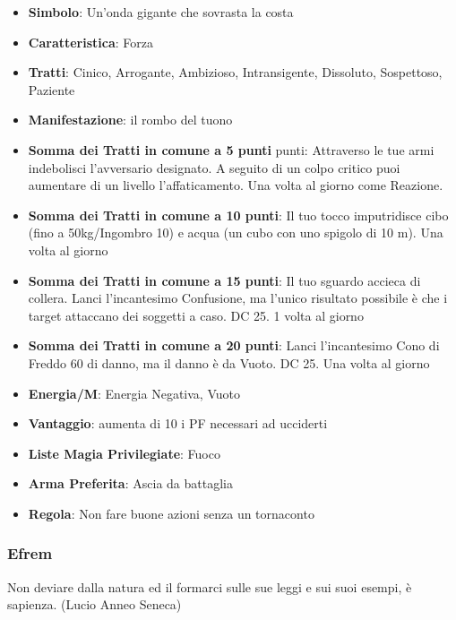 \begin{multicols}{2}
\begin{itemize}[leftmargin=*] \setlength{\itemsep}{0pt}
\item \textbf{Simbolo}: Un'onda gigante che sovrasta la costa
\item \textbf{Caratteristica}: Forza
\item \textbf{Tratti}: Cinico, Arrogante, Ambizioso, Intransigente, Dissoluto, Sospettoso, Paziente
\item \textbf{Manifestazione}: il rombo del tuono
\item \textbf{Somma dei Tratti in comune a 5 punti} punti: Attraverso le tue armi indebolisci l'avversario designato. A seguito di un colpo critico puoi aumentare di un livello l'affaticamento. Una volta al giorno come Reazione.
\item \textbf{Somma dei Tratti in comune a 10 punti}: Il tuo tocco imputridisce cibo (fino a 50kg/Ingombro 10) e acqua (un cubo con uno spigolo di 10 m). Una volta al giorno
\item \textbf{Somma dei Tratti in comune a 15 punti}: Il tuo sguardo accieca di collera. Lanci l'incantesimo Confusione, ma l'unico risultato possibile è che i target attaccano dei soggetti a caso. DC 25. 1 volta al giorno
\item \textbf{Somma dei Tratti in comune a 20 punti}: Lanci l'incantesimo Cono di Freddo 60 di danno, ma il danno è da Vuoto. DC 25. Una volta al giorno
\item \textbf{Energia/M}: Energia Negativa, Vuoto
\item \textbf{Vantaggio}: aumenta di 10 i PF necessari ad ucciderti
\item \textbf{Liste Magia Privilegiate}: Fuoco
\item \textbf{Arma Preferita}: Ascia da battaglia
\item \textbf{Regola}: Non fare buone azioni senza un tornaconto
\end{itemize}

\subsubsection{Efrem}\label{efrem}\hypertarget{efrem}{}

\begin{changemargin}{0.3cm}{0.3cm}\begin{enfasi}{
Non deviare dalla natura ed il formarci sulle sue leggi e sui suoi esempi, è sapienza. (Lucio Anneo Seneca)
}\end{enfasi}\end{changemargin}\medskip


\end{multicols}
